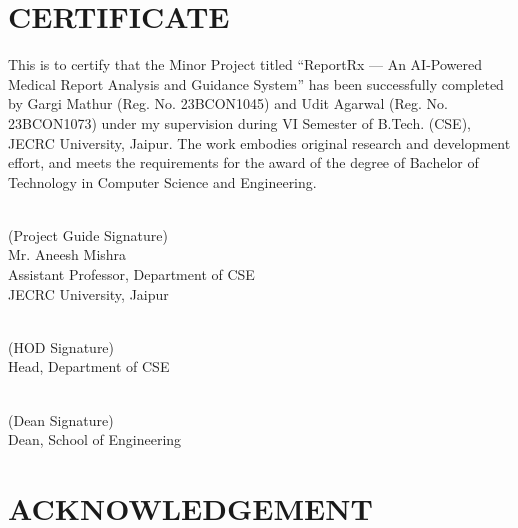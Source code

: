 \documentclass[12pt,a4paper]{report}
\begin{document}
\chapter*{CERTIFICATE}

\noindent This is to certify that the Minor Project titled ``ReportRx --- An AI-Powered Medical Report Analysis and Guidance System'' has been successfully completed by Gargi Mathur (Reg. No. 23BCON1045) and Udit Agarwal (Reg. No. 23BCON1073) under my supervision during VI Semester of B.Tech. (CSE), JECRC University, Jaipur. The work embodies original research and development effort, and meets the requirements for the award of the degree of Bachelor of Technology in Computer Science and Engineering.

\vspace{2cm}
\noindent\begin{minipage}{0.4\textwidth}
    \hrulefill \\
    (Project Guide Signature) \\[0.2cm]
    Mr. Aneesh Mishra \\[0.2cm]
    Assistant Professor, Department of CSE \\[0.2cm]
    JECRC University, Jaipur
\end{minipage}

\vspace{2cm}
\noindent\begin{minipage}{0.3\textwidth}
    \hrulefill \\
    (HOD Signature) \\[0.2cm]
    Head, Department of CSE
\end{minipage}

\vspace{2cm}
\noindent\begin{minipage}{0.3\textwidth}
    \hrulefill \\
    (Dean Signature) \\[0.2cm]
    Dean, School of Engineering
\end{minipage}

\clearpage

\setcounter{page}{3}
\thispagestyle{plain}

\chapter*{ACKNOWLEDGEMENT}
\end{document}
